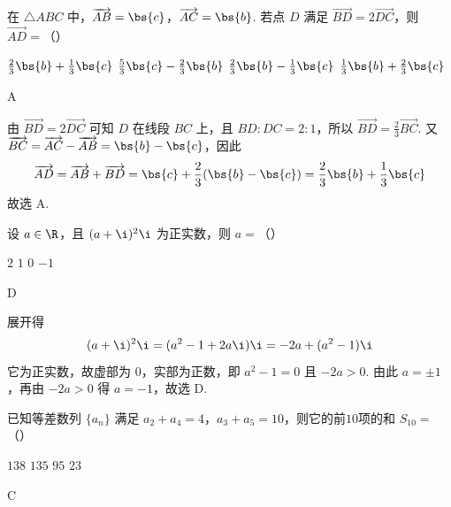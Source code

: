 \begin{problem}
在 \(\triangle ABC\) 中，\(\overrightarrow{AB} = \bs{c}\)，\(\overrightarrow{AC} = \bs{b}\). 若点 \(D\) 满足 \(\overrightarrow{BD} = 2\overrightarrow{DC}\)，则 \(\overrightarrow{AD}=\)（\quad）

\choices
    {\(\frac{2}{3}\bs{b} + \frac{1}{3}\bs{c}\)}
    {\(\frac{5}{3}\bs{c} - \frac{2}{3}\bs{b}\)}
    {\(\frac{2}{3}\bs{b} - \frac{1}{3}\bs{c}\)}
    {\(\frac{1}{3}\bs{b} + \frac{2}{3}\bs{c}\)}
\end{problem}

\begin{answer}
A
\end{answer}

\begin{solution}
由 \(\overrightarrow{BD}=2\overrightarrow{DC}\) 可知 \(D\) 在线段 \(BC\) 上，且 \(BD:DC=2:1\)，所以 \(\overrightarrow{BD}=\frac{2}{3}\overrightarrow{BC}\). 又 \(\overrightarrow{BC}=\overrightarrow{AC}-\overrightarrow{AB}=\bs{b}-\bs{c}\)，因此
\[
\overrightarrow{AD}=\overrightarrow{AB}+\overrightarrow{BD}=\bs{c}+\frac{2}{3}(\bs{b}-\bs{c})=\frac{2}{3}\bs{b}+\frac{1}{3}\bs{c}
\]
故选 A.
\end{solution}

\begin{problem}
设 \(a \in \R\)，且 \((a+\i)^2 \i\) 为正实数，则 \(a =\)（\quad）

\choices
    {\(2\)}
    {\(1\)}
    {\(0\)}
    {\(-1\)}
\end{problem}

\begin{answer}
D
\end{answer}

\begin{solution}
展开得
\[
(a+\i)^2\i=(a^2-1+2a\i)\i=-2a+(a^2-1)\i
\]
它为正实数，故虚部为 \(0\)，实部为正数，即 \(a^2-1=0\) 且 \(-2a>0\). 由此 \(a=\pm1\)，再由 \(-2a>0\) 得 \(a=-1\)，故选 D.
\end{solution}

\begin{problem}
已知等差数列 \(\{a_{n}\}\) 满足 \(a_{2} + a_{4} = 4\)，\(a_{3} + a_{5} = 10\)，则它的前\(10\)项的和 \(S_{10} =\)（\quad）

\choices
    {\(138\)}
    {\(135\)}
    {\(95\)}
    {\(23\)}
\end{problem}

\begin{answer}
C
\end{answer}

